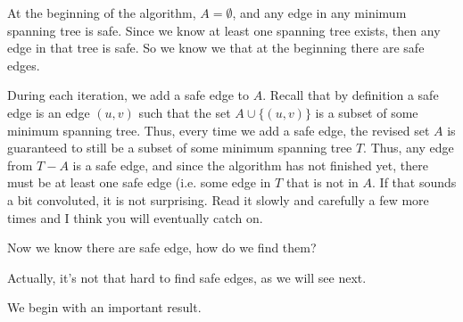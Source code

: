 At the beginning of the algorithm, $A=\emptyset$, and
any edge in any minimum spanning tree is safe. Since we know
at least one spanning tree exists, then any edge in that tree is safe. 
So we know we that at the beginning there are safe edges.

During each iteration, we add a safe edge to $A$. Recall that
by definition a safe edge is an edge 
$(u,v)$ such that the set $A\cup\{(u,v)\}$ is a
subset of some minimum spanning tree.
Thus, every time we add a safe edge, the revised set $A$ is
guaranteed to still be a subset of some minimum spanning tree $T$.
Thus, any edge from $T-A$ is a safe edge, and since the algorithm 
has not finished yet, there must be at least one safe edge (i.e.
some edge in $T$ that is not in $A$. If that sounds a bit convoluted,
it is not surprising. Read it slowly and carefully a few more times 
and I think you will eventually catch on.

Now we know there are safe edge, how do we find them?

Actually, it's not that hard to find safe edges, as
we will see next.

We begin with an important result.


